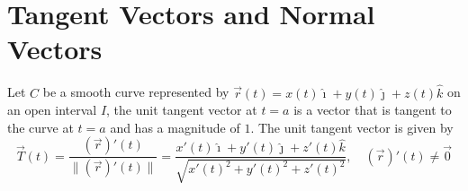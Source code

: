 \chapter {Tangent Vectors and Normal Vectors}

Let $C$ be a smooth curve represented by $\vec{r}(t) = x(t)\hat{\imath} +
    y(t)\hat{\jmath} + z(t)\hat{k}$ on an open interval $I$, the unit tangent
vector at $t = a$ is a vector that is tangent to the curve at $t = a$ and has a
magnitude of $1$. The unit tangent vector is given by \[\vec{T}(t) = \frac{(\vec{r})'(t)}{\lVert(\vec{r})'(t)\rVert} = \frac{x'(t)\hat{\imath} + y'(t)\hat{\jmath} + z'(t)\hat{k}}{\sqrt{x'(t)^2 + y'(t)^2 + z'(t)^2}}, \quad (\vec{r})'(t) \neq \vec{0}\]

